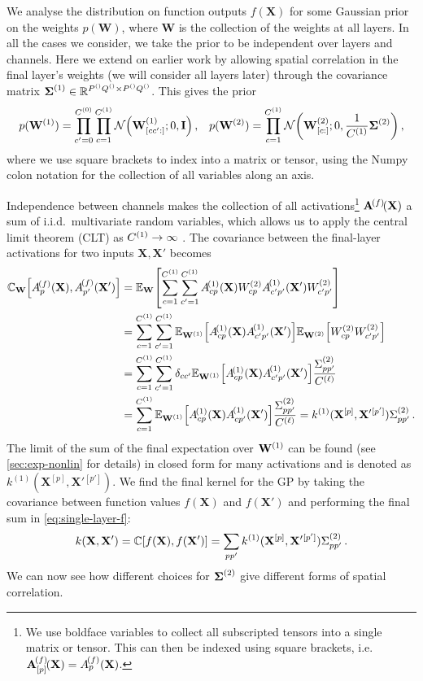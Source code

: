 \documentclass[tablecaption=bottom,wcp,nonatbib]{jmlr} %
\newcommand{\vX}{\mathbf{X}}
\newcommand{\vW}{\mathbf{W}}
\newcommand{\eye}{\mathbf{I}}
\begin{document}
We analyse the distribution on function outputs $f(\vX)$ for some Gaussian prior on the weights $p(\vW)$, where $\vW$ is the collection of the weights at all layers. In all the cases we consider, we take the prior to be independent over layers and channels. Here we extend on earlier work by allowing spatial correlation in the final layer's weights (we will consider all layers later) through the covariance matrix $\boldsymbol{\Sigma}^{(1)} \in \mathbb{R}^{P^{()}Q^{()}\times P^{()}Q^{()}}$. This gives the prior
\begin{align}
    p(\layerW1) = \prod_{c'=0}^{\layerC0}\prod_{c=1}^{\layerC1}\NormDist{\layerW1_{[cc':]}; 0, \eye} \,,
    && p(\layerW2) = \prod_{c=1}^{\layerC1} \NormDist{\layerW2_{[c:]}; 0, \frac{1}{\layerC1}\priorWcov2} \,,
\end{align}
where we use square brackets to index into a matrix or tensor, using the Numpy colon notation for the collection of all variables along an axis.

Independence between channels makes the collection of all activations\footnote{We use boldface variables to collect all subscripted tensors into a single matrix or tensor. This can then be indexed using square brackets, i.e.~$\layerNLA{(f)}{[p]} = \layerNLAs{(f)}{p}$.} $\layerNLA{(f)}{}$ a sum of i.i.d.~multivariate random variables, which allows us to apply the central limit theorem (CLT) as $C^{(1)}\to\infty$ \citep{neal1996bayesian}. The covariance between the final-layer activations for two inputs $\vX,\vX'$ becomes
\begin{align}
    \mathbb{C}_{\vW}\left[\layerNLAs{(f)}{p},\layerNLAsd{(f)}{p'}\right] &= \Exp{\vW}{\sum_{c=1}^{\layerC1}\sum_{c'=1}^{\layerC1} \layerNLAs{(1)}{cp}\layerWs{2}_{cp}\layerNLAsd{(1)}{c'p'}\layerWs{2}_{c'p'}} \nonumber \\
    &= \sum_{c=1}^{\layerC1}\sum_{c'=1}^{\layerC1} \Exp{\layerW1}{\layerNLAs{(1)}{cp}\layerNLAsd{(1)}{c'p'}}\Exp{\layerW2}{\layerWs{2}_{cp} \layerWs{2}_{c'p'}} \nonumber \\
    &= \sum_{c=1}^{\layerC1}\sum_{c'=1}^{\layerC1} \delta_{cc'} \Exp{\layerW1}{\layerNLAs{(1)}{cp}\layerNLAsd{(1)}{c'p'}}\frac{\priorWcovs{2}_{pp'}}{\layerC{\ell}} \nonumber \\
    &= \sum_{c=1}^{\layerC1} \Exp{\layerW1}{\layerNLAs{(1)}{cp}\layerNLAsd{(1)}{cp'}} \frac{\priorWcovs{2}_{pp'}}{\layerC{\ell}} = k^{(1)}(\vX^{[p]}, {\vX'}{}^{[p']}) \priorWcovs{2}_{pp'} \,.
\end{align}
The limit of the sum of the final expectation over $\layerW1$ can be found (see \cref{sec:exp-nonlin} for details) in closed form for many activations and is denoted as $k^{(1)}(\vX^{[p]}, {\vX'}{}^{[p']})$.
We find the final kernel for the GP by taking the covariance between function values $f(\vX)$ and $f(\vX')$ and performing the final sum in \cref{eq:single-layer-f}:
\begin{align}
    k(\vX, \vX') = \mathbb{C}\left[f(\vX), f(\vX')\right] = \sum_{pp'} k^{(1)}(\vX^{[p]}, {\vX'}{}^{[p']}) \priorWcovs{2}_{pp'} \label{eq:cov-kernel} \,.
\end{align}
We can now see how different choices for $\boldsymbol{\Sigma}^{(2)}$ give different forms of spatial correlation.
\end{document}

